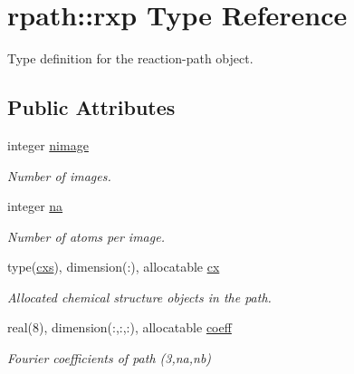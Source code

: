 \hypertarget{structrpath_1_1rxp}{}\section{rpath\+:\+:rxp Type Reference}
\label{structrpath_1_1rxp}


Type definition for the reaction-\/path object.  


\subsection*{Public Attributes}
\begin{DoxyCompactItemize}
\item 
\mbox{\label{structrpath_1_1rxp_a41850c8176424e44a01af2adcb3eaa45}} 
integer \mbox{\hyperlink{structrpath_1_1rxp_a41850c8176424e44a01af2adcb3eaa45}{nimage}}
\begin{DoxyCompactList}\small\item\em Number of images. \end{DoxyCompactList}\item 
\mbox{\label{structrpath_1_1rxp_a9b645f64ca4b1103cf46241ac702f34a}} 
integer \mbox{\hyperlink{structrpath_1_1rxp_a9b645f64ca4b1103cf46241ac702f34a}{na}}
\begin{DoxyCompactList}\small\item\em Number of atoms per image. \end{DoxyCompactList}\item 
\mbox{\label{structrpath_1_1rxp_a4c4a9be8011866e0dbd5c5d930b048bc}} 
type(\mbox{\hyperlink{structchemstr_1_1cxs}{cxs}}), dimension(\+:), allocatable \mbox{\hyperlink{structrpath_1_1rxp_a4c4a9be8011866e0dbd5c5d930b048bc}{cx}}
\begin{DoxyCompactList}\small\item\em Allocated chemical structure objects in the path. \end{DoxyCompactList}\item 
\mbox{\label{structrpath_1_1rxp_aabf2a9ba3aa2a7627e9a6b225e8f857e}} 
real(8), dimension(\+:,\+:,\+:), allocatable \mbox{\hyperlink{structrpath_1_1rxp_aabf2a9ba3aa2a7627e9a6b225e8f857e}{coeff}}
\begin{DoxyCompactList}\small\item\em Fourier coefficients of path (3,na,nb) \end{DoxyCompactList}\item 

\end{DoxyCompactItemize}

